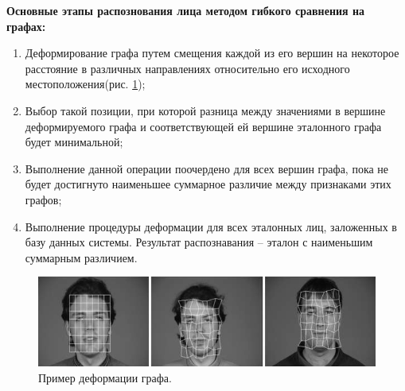 \textbf{Основные этапы распознования лица методом гибкого сравнения на графах:}
\begin{enumerate}
    \item Деформирование графа путем смещения каждой из его вершин на некоторое расстояние
    в различных направлениях относительно его исходного местоположения(рис. \ref{img:demonstration});
    \item Выбор такой позиции, при которой разница между значениями в вершине деформируемого графа и 
    соответствующей ей вершине эталонного графа будет минимальной;
    \item Выполнение данной операции поочердено для всех вершин графа, пока не будет достигнуто наименьшее суммарное различие 
    между признаками этих графов;
    \item  Выполнение процедуры деформации для всех эталонных лиц, заложенных в базу данных системы. 
    Результат распознавания -- эталон с наименьшим суммарным различием.
\end{enumerate}

\begin{figure}[h]
    \centering
    \includegraphics[height=0.15\textheight]{img/img_a.jpg}
    \caption{Пример деформации графа.}
    \label{img:demonstration}
\end{figure}
    